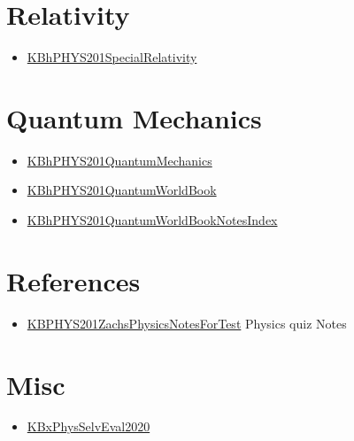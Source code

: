 \documentclass[letterpaper]{article}
\begin{document}
\section{Relativity}
\label{sec:org21236e8}
\begin{itemize}
\item \href{KBhPHYS201SpecialRelativity.org}{KBhPHYS201SpecialRelativity}
\end{itemize}

\section{Quantum Mechanics}
\label{sec:org9176157}
\begin{itemize}
\item \href{KBhPHYS201QuantumMechanics.org}{KBhPHYS201QuantumMechanics}
\item \href{KBhPHYS201QuantumWorldBook.org}{KBhPHYS201QuantumWorldBook}
\item \href{KBhPHYS201QuantumWorldBookNotesIndex.org}{KBhPHYS201QuantumWorldBookNotesIndex}
\end{itemize}

\section{References}
\label{sec:org00ec4f5}
\begin{itemize}
\item \href{KBPHYS201ZachsPhysicsNotesForTest.org}{KBPHYS201ZachsPhysicsNotesForTest}
Physics quiz Notes
\end{itemize}

\section{Misc}
\label{sec:org8488732}
\begin{itemize}
\item \href{KBxPhysSelvEval2020.org}{KBxPhysSelvEval2020}
\end{itemize}
\end{document}
